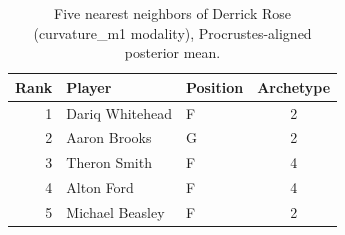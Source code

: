 \begin{table}[htbp]
  \centering\small
  \begin{tabular}{rllc}
    \toprule
    Rank & Player & Position & Archetype \\
    \midrule
    1 & Dariq Whitehead & F & 2 \\
    2 & Aaron Brooks & G & 2 \\
    3 & Theron Smith & F & 4 \\
    4 & Alton Ford & F & 4 \\
    5 & Michael Beasley & F & 2 \\
    \bottomrule
  \end{tabular}
  \caption{Five nearest neighbors of Derrick Rose (curvature_m1 modality), Procrustes-aligned posterior mean.}
  \label{tab:Derrick_Rose_neighbors_curvature_m1}
\end{table}

